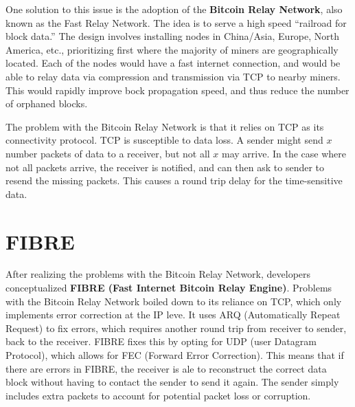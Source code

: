 \documentclass[full.tex]{subfiles}
\begin{document}
 One solution to this issue is the adoption of the \textbf{Bitcoin Relay Network}, also known as the Fast Relay Network. The idea is to serve a high speed ``railroad for block data.'' The design involves installing nodes in China/Asia, Europe, North America, etc., prioritizing first where the majority of miners are geographically located. Each of the nodes would have a fast internet connection, and would be able to relay data via compression and transmission via TCP to nearby miners. This would rapidly improve bock propagation speed, and thus reduce the number of orphaned blocks.
 
 The problem with the Bitcoin Relay Network is that it relies on TCP as its connectivity protocol. TCP is susceptible to data loss. A sender might send $x$ number packets of data to a receiver, but not all $x$ may arrive. In the case where not all packets arrive, the receiver is notified, and can then ask to sender to resend the missing packets. This causes a round trip delay for the time-sensitive data.
 
 \section*{FIBRE}
 
 After realizing the problems with the Bitcoin Relay Network, developers conceptualized \textbf{FIBRE (Fast Internet Bitcoin Relay Engine)}. Problems with the Bitcoin Relay Network boiled down to its reliance on TCP, which only implements error correction at the IP leve. It uses ARQ (Automatically Repeat Request) to fix errors, which requires another round trip from receiver to sender, back to the receiver. FIBRE fixes this by opting for UDP (user Datagram Protocol), which allows for FEC (Forward Error Correction). This means that if there are errors in FIBRE, the receiver is ale to reconstruct the correct data block without having to contact the sender to send it again. The sender simply includes extra packets to account for potential packet loss or corruption.

 
 
    
    
    
    
    \newpage
    \thispagestyle{firstpage}
    \vspace*{2\baselineskip}
\end{document}
